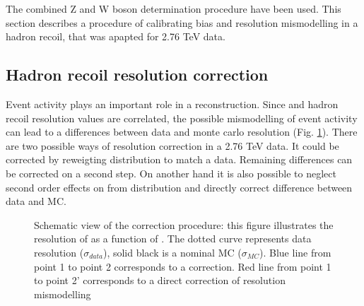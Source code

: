 The combined Z and W boson determination procedure have been used. This section describes a procedure of calibrating bias and resolution mismodelling in a hadron recoil, that was apapted for 2.76 TeV data. 

\subsection{Hadron recoil resolution correction}


Event activity plays an important role in a \etmiss reconstruction. Since \sumet and hadron recoil resolution values are correlated, the possible mismodelling of event activity can lead to a differences between data and monte carlo \etmiss resolution (Fig. \ref{ris:sumetCor}). There are two possible ways of resolution correction in a 2.76 TeV data. It could be corrected by reweigting \sumet distribution to match a data. Remaining differences can be corrected on a second step. On another hand it is also possible to neglect second order effects on \etmiss from \sumet distribution and directly correct difference between data and MC. 

\begin{figure}[!tbp]
\begin{center}

\begin{minipage}[h]{0.7\linewidth}
\end{minipage}

\end{center}
\caption{Schematic view of the correction procedure: this figure illustrates the resolution of \uperp as a function of \sumet. The dotted curve represents data resolution ($\sigma_{data}$), solid black is a nominal MC ($\sigma_{MC}$). Blue line from point 1 to point 2 corresponds to a \sumet correction. Red line from point 1 to point 2' corresponds to a direct correction of resolution mismodelling }

\label{ris:sumetCor}
\end{figure}


